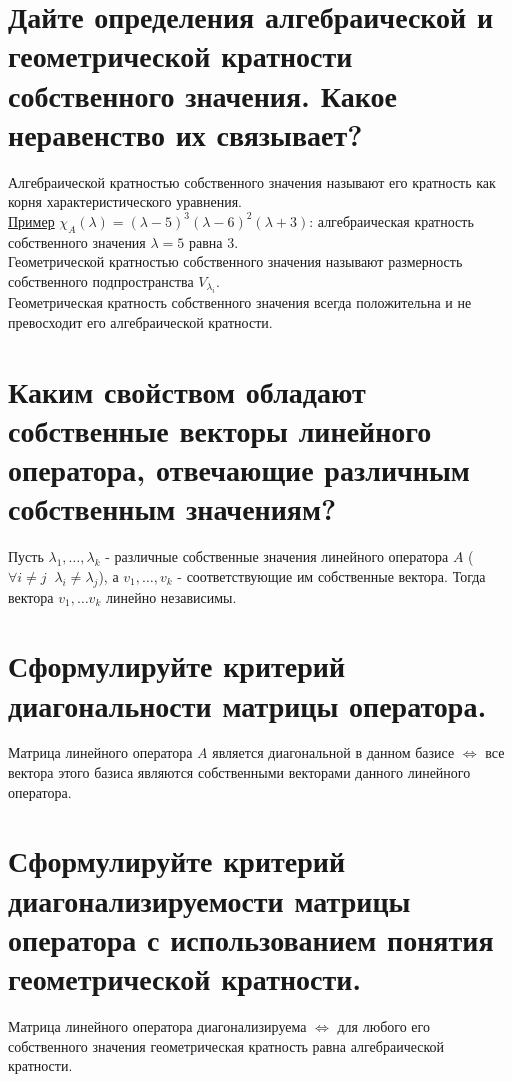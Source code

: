 \documentclass{article}
\begin{document}
\section{Дайте определения алгебраической и геометрической кратности собственного значения. Какое неравенство их связывает?}
Алгебраической кратностью собственного значения называют его кратность как корня характеристического уравнения.
\\
\underline{Пример} $\chi_A(\lambda) = (\lambda - 5)^3 (\lambda - 6)^2 (\lambda + 3)$:
алгебраическая кратность собственного значения $\lambda = 5$ равна 3.
\\
Геометрической кратностью собственного значения называют размерность собственного подпространства $V_{\lambda_i}$.
\\
Геометрическая кратность собственного значения всегда положительна и не превосходит его алгебраической кратности.

\section{Каким свойством обладают собственные векторы линейного оператора, отвечающие различным собственным значениям?}
Пусть $\lambda_1, \ldots, \lambda_k$ - различные собственные значения линейного оператора $A$
($\forall i \neq j \;\; \lambda_i \neq \lambda_j$), 
а $v_1, \ldots, v_k$ - соответствующие им собственные вектора.
Тогда вектора $v_1, \ldots v_k$ линейно независимы.

\section{Сформулируйте критерий диагональности матрицы оператора.}
Матрица линейного оператора $A$ является диагональной в данном базисе $\iff$ все вектора этого базиса являются собственными векторами 
данного линейного оператора.

\section{Сформулируйте критерий диагонализируемости матрицы оператора с использованием понятия геометрической кратности.}
Матрица линейного оператора диагонализируема $\iff$ для любого его собственного значения геометрическая кратность
равна алгебраической кратности.
\end{document}
